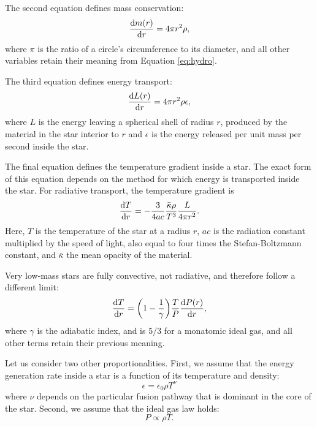 The second equation defines mass conservation:
\begin{equation}
\frac{\operatorname{d}\!{m}(r)}{\operatorname{d}\!{r}} = 4 \pi r^2 \rho,
\end{equation}
where $\pi$ is the ratio of a circle's circumference to its diameter,
and all other variables retain their meaning from Equation \ref{eq:hydro}.

The third equation defines energy transport:
\begin{equation}
\frac{\operatorname{d}\!{L}(r)}{\operatorname{d}\!{r}} = 4 \pi r^2 \rho \epsilon,
\end{equation}
where $L$ is the energy leaving a spherical shell of radius $r$, produced by the
material in the star interior to $r$ and $\epsilon$ is the energy released per unit
mass per second inside the star.

The final equation defines the temperature gradient inside a star. 
The exact form of this equation depends on the method for which energy is transported
inside the star.
For radiative transport, the temperature gradient is
\begin{equation}
\frac{\operatorname{d}\!{T}}{\operatorname{d}\!{r}} = - \frac{3}{4ac} \frac{\bar{\kappa} \rho}{T^3} \frac{L}{4\pi r^2}.
\end{equation}
Here, $T$ is the temperature of the star at a radius $r$, $ac$ is the radiation constant multiplied by the speed of light, also equal to four times the Stefan-Boltzmann
constant, and $\bar{\kappa}$ the mean opacity of the material.

Very low-mass stars are fully convective, not radiative, and therefore follow
a different limit:
\begin{equation}
\frac{\operatorname{d}\!{T}}{\operatorname{d}\!{r}} =  \bigg( 1 - \frac{1}{\gamma}\bigg)\frac{T}{P}\frac{\operatorname{d}\!{P}(r)}{\operatorname{d}\!{r}},
\end{equation}
where $\gamma$ is the adiabatic index, and is $5/3$ for a monatomic ideal gas,
and all other terms retain their previous meaning.

Let us consider two other proportionalities. First, we assume that the energy generation rate
inside a star is a function of its temperature and density:
\begin{equation}
\epsilon = \epsilon_0 \rho T^\nu
\end{equation}
where $\nu$ depends on the particular fusion pathway that is dominant in the core of
the star.
Second, we assume that the ideal gas law holds:
\begin{equation}
P \propto \rho T.
\end{equation}

